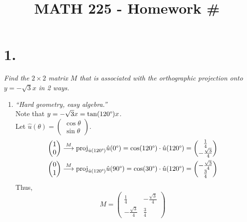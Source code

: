 \documentclass[12pt]{article}
\title{\vspace{-2\baselineskip}MATH 225 - Homework \#\HOMEWORKNUM}
\author{\NAME}
\date{\DATE}
\begin{document}
\maketitle

\section*{1.}
\textit{Find the $2 \times 2$ matrix $M$ that is associated with the
orthographic projection onto ${y = -\sqrt{3}x}$ in 2 ways.}
\begin{enumerate}[label=(\alph*)]
	\item \textit{``Hard geometry, easy algebra.''}
	\\[\baselineskip]
	Note that $y = -\sqrt{3}x = \tan(120 \degree)x$. \\
	Let $\hat u(\theta) =
	\begin{pmatrix} \cos \theta \\ \sin \theta \end{pmatrix}$.
	\begin{gather*}
		\begin{pmatrix} 1 \\ 0 \end{pmatrix}
		\overset{M}{\longrightarrow}
		\text{proj}_{\hat u(120 \degree)} \hat u(0 \degree)
		=
		\cos(120 \degree) \cdot \hat u(120 \degree)
		=
		\begin{pmatrix} \frac{1}{4} \\ -\frac{\sqrt{3}}{4} \end{pmatrix}
		\\
		\begin{pmatrix} 0 \\ 1 \end{pmatrix}
		\overset{M}{\longrightarrow}
		\text{proj}_{\hat u(120 \degree)} \hat u(90 \degree)
		=
		\cos(30 \degree) \cdot \hat u(120 \degree)
		=
		\begin{pmatrix} -\frac{\sqrt{3}}{4} \\ \frac{3}{4} \end{pmatrix}
	\end{gather*}
	Thus,
	\begin{equation*}
		M =
		\boxed{
			\begin{pmatrix}
				\frac{1}{4} & -\frac{\sqrt{3}}{4} \\
				-\frac{\sqrt{3}}{4} & \frac{3}{4}
			\end{pmatrix}
}
\end{equation*}
\end{enumerate}
\end{document}
